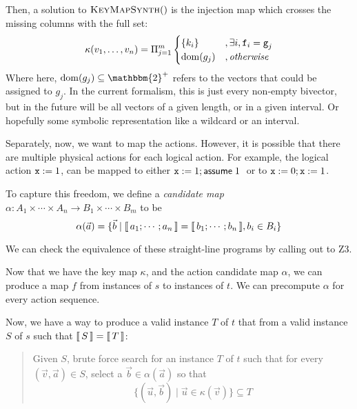 Then, a solution to $\textsc{KeyMapSynth}()$ is the injection map which crosses the missing columns with the full set:
\[\displaystyle \kappa (v_1, \ldots, v_n) = \Pi_{j=1}^m \begin{cases}
    \{k_i\} &, \exists i,  \texttt{f}_i = \texttt{g}_j \\
    \mathrm{dom}(g_j) &, \mathit{otherwise}
  \end{cases}
\]
Where here, $\dom(g_j) \subseteq \mathbbm{2}^+$ refers to the vectors
that could be assigned to $g_j$. In the current formalism, this is
just every non-empty bivector, but in the future will be all vectors
of a given length, or in a given interval. Or hopefully some symbolic
representation like a wildcard or an interval.


Separately, now, we want to map the actions. However, it is possible
that there are multiple physical actions for each logical action. For
example, the logical action $\texttt{x}:=1$, can be mapped to either
$\texttt{x} := 1; \mathsf{assume}\; 1\;$ or to $\texttt{x}:= 0; \texttt{x}:= 1$.

To capture this freedom, we define a \emph{candidate map}
$\alpha : A_1 \times \cdots \times A_n \to B_1 \times \cdots \times
B_m$ to be
\[\alpha(\vec a) = \{\vec b \mid \llbracket\,a_1;\cdots;a_n\,\rrbracket =
  \llbracket\,b_1; \cdots; b_n\,\rrbracket, b_i \in B_i  \}\]

We can check the equivalence of these straight-line programs by
calling out to Z3.

Now that we have the key map $\kappa$, and the action candidate map
$\alpha$, we can produce a map $f$ from instances of $s$ to instances
of $t$. We can precompute $\alpha$ for every action sequence.

Now, we have a way to produce a valid instance $T$ of $t$ that from a
valid instance $S$ of $s$ such that $\llbracket\,S\,\rrbracket = \llbracket\,T\,\rrbracket$:
\begin{quote}
  Given $S$, brute force search for an instance $T$ of $t$ such that
  for every $(\vec v, \vec a) \in S$, select a
  $\vec b \in \alpha(\vec a)$ so that
  \[\{(\vec u, \vec b) \mid \vec u \in
    \kappa(\vec v)\} \subseteq T\]
\end{quote}



